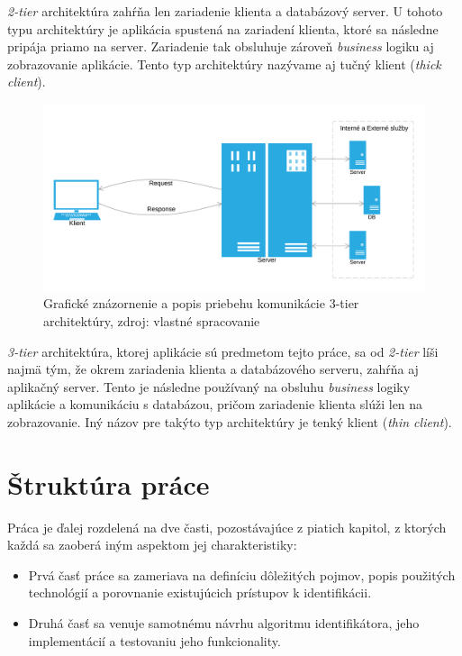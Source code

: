 \documentclass[
  digital, %
  table,   %
  lof,     %
  nolot,   %
  nocover
]{fithesis3}
\begin{document}
\textit{2-tier} architektúra zahŕňa len zariadenie klienta a databázový server.
U tohoto typu architektúry je aplikácia spustená na zariadení klienta, ktoré sa
následne pripája priamo na server. Zariadenie tak obsluhuje zároveň
\textit{business} logiku aj zobrazovanie aplikácie. Tento typ architektúry
nazývame aj tučný klient (\textit{thick client}).

\begin{figure}[H]
  \centering
    \includegraphics[width=\textwidth]{images/C-S-thin.png}
  \caption{Grafické znázornenie a popis priebehu komunikácie 3-tier architektúry,
  zdroj: vlastné spracovanie}
  \label{fig:cs-thin}
\end{figure}

\textit{3-tier} architektúra, ktorej aplikácie sú predmetom tejto práce, sa od
\textit{2-tier} líši najmä tým, že okrem zariadenia klienta a databázového serveru,
zahŕňa aj aplikačný server. Tento je následne používaný na obsluhu
\textit{business} logiky aplikácie a komunikáciu s databázou, pričom zariadenie
klienta slúži len na zobrazovanie. Iný názov pre takýto typ architektúry je tenký
klient (\textit{thin client}).

\section{Štruktúra práce}
Práca je ďalej rozdelená na dve časti, pozostávajúce z piatich kapitol, z ktorých každá sa zaoberá iným aspektom
jej charakteristiky:
\begin{itemize}
\item Prvá časť práce sa zameriava na
definíciu dôležitých pojmov, popis použitých technológií a porovnanie existujúcich prístupov k identifikácii.
\item Druhá časť sa venuje samotnému návrhu algoritmu identifikátora, jeho implementácií a testovaniu jeho funkcionality.
\end{itemize}
\end{document}
